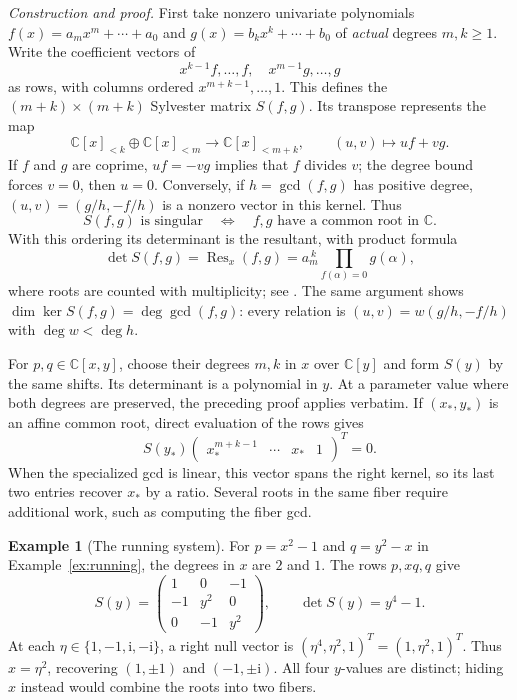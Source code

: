 \documentclass[12pt]{article}
\def\C{\mathbb{C}}
\DeclareMathOperator{\Res}{Res}
\theoremstyle{definition}
\newtheorem{example}[theorem]{Example}
\theoremstyle{remark}
\begin{document}
\emph{Construction and proof.} First take nonzero univariate polynomials
$f(x)=a_mx^m+\cdots+a_0$ and $g(x)=b_kx^k+\cdots+b_0$ of
\emph{actual} degrees $m,k\ge1$. Write the coefficient vectors of
\[
  x^{k-1}f,\ldots,f,\quad x^{m-1}g,\ldots,g
\]
as rows, with columns ordered $x^{m+k-1},\ldots,1$. This defines the
$(m+k)\times(m+k)$ Sylvester matrix $S(f,g)$. Its transpose represents the map
\[
  \C[x]_{<k}\oplus\C[x]_{<m}\longrightarrow\C[x]_{<m+k},
  \qquad (u,v)\longmapsto uf+vg.
\]
If $f$ and $g$ are coprime, $uf=-vg$ implies that $f$ divides $v$; the degree
bound forces $v=0$, then $u=0$. Conversely, if $h=\gcd(f,g)$ has positive
degree, $(u,v)=(g/h,-f/h)$ is a nonzero vector in this kernel. Thus
\[
  S(f,g)\text{ is singular}\quad\Longleftrightarrow\quad
  f,g\text{ have a common root in }\C.
\]
With this ordering its determinant is the resultant, with product formula
\[
  \det S(f,g)=\Res_x(f,g)
  =a_m^{\,k}\prod_{f(\alpha)=0}g(\alpha),
\]
where roots are counted with multiplicity; see \cite[Ch.~3]{cox2005using}.
The same argument shows $\dim\ker S(f,g)=\deg\gcd(f,g)$: every relation is
$(u,v)=w(g/h,-f/h)$ with $\deg w<\deg h$.

For $p,q\in\C[x,y]$, choose their degrees $m,k$ in $x$ over $\C[y]$ and
form $S(y)$ by the same shifts. Its determinant is a polynomial in $y$.
At a parameter value where both degrees are preserved, the preceding proof
applies verbatim. If $(x_*,y_*)$ is an affine common root, direct evaluation
of the rows gives
\[
  S(y_*)\begin{pmatrix}x_*^{m+k-1}&\cdots&x_*&1\end{pmatrix}^{T}=0.
\]
When the specialized gcd is linear, this vector spans the right kernel, so
its last two entries recover $x_*$ by a ratio. Several roots in the same
fiber require additional work, such as computing the fiber gcd.

\begin{example}[The running system]\label{ex:sylvester-running}
  For $p=x^2-1$ and $q=y^2-x$ in Example~\ref{ex:running}, the degrees in
  $x$ are $2$ and $1$. The rows $p,xq,q$ give
  \[
    S(y)=\begin{pmatrix}1&0&-1\\-1&y^2&0\\0&-1&y^2\end{pmatrix},
    \qquad \det S(y)=y^4-1.
  \]
  At each $\eta\in\{1,-1,\mathrm{i},-\mathrm{i}\}$, a right null vector is
  $(\eta^4,\eta^2,1)^T=(1,\eta^2,1)^T$. Thus $x=\eta^2$, recovering
  $(1,\pm1)$ and $(-1,\pm\mathrm{i})$. All four $y$-values are distinct;
  hiding $x$ instead would combine the roots into two fibers.
\end{example}
\end{document}
